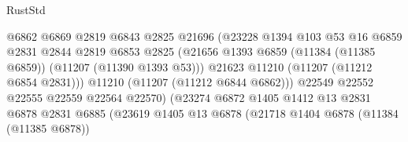 \begin{lexlean}{RustStd}
\begin{coremodule}
                                            @6862
                                            @6869
                                            @2819
                                            @6843
                                            @2825
                                            @21696
                                            (@23228
                                              @1394
                                              @103
                                              @53
                                              @16
                                              @6859
                                              @2831
                                              @2844
                                              @2819
                                              @6853
                                              @2825
                                              (@21656
                                                @1393
                                                @6859
                                                (@11384 (@11385 @6859))
                                                (@11207 (@11390 @1393 @53)))
                                              @21623
                                              @11210
                                              (@11207 (@11212 @6854 @2831)))
                                            @11210
                                            (@11207 (@11212 @6844 @6862)))
                                          @22549
                                          @22552
                                          @22555
                                          @22559
                                          @22564
                                          @22570)
                                        (@23274
                                          @6872
                                          @1405
                                          @1412
                                          @13
                                          @2831
                                          @6878
                                          @2831
                                          @6885
                                          (@23619
                                            @1405
                                            @13
                                            @6878
                                            (@21718
                                              @1404
                                              @6878
                                              (@11384 (@11385 @6878))

\end{coremodule}
\end{lexlean}
